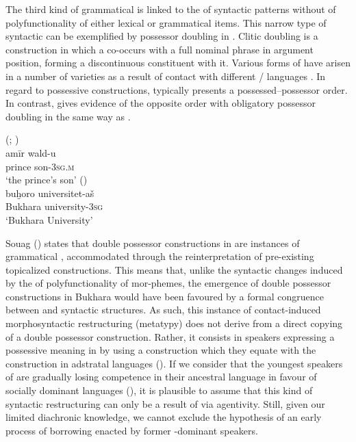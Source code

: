 \documentclass[output=paper]{langsci/langscibook}
\begin{document}
The third kind of grammatical  is linked to the  of syntactic patterns without  of polyfunctionality of either lexical or grammatical items. This narrow type of syntactic  can be exemplified by possessor doubling in   \citep{Ratcliffe2005}. Clitic doubling is a construction in which a  co-occurs with a full nominal phrase in argument position, forming a discontinuous constituent with it. Various forms of  have arisen in a number of  varieties as a result of contact with different / languages \citep{Souag2017clitic}. In regard to possessive constructions,  typically presents a possessed–possessor order. In contrast,    gives evidence of the opposite order with obligatory possessor doubling in the same way as  . 

\ea\label{28}
{  (\citealt{Ratcliffe2005}; \citealt[56]{Souag2017clitic})}\\
\gll   amīr wald-u\\
        prince son-\textsc{3sg.m}\\
\glt   `the prince’s son'
\ex \label{29}
{ (\citealt[56]{Souag2017clitic})}\\
\gll   buḫoro universitet-aš\\
       Bukhara university-\textsc{3sg}\\
\glt   `Bukhara University'
\z

Souag (\citeyear[157]{Souag2017clitic}) states that double possessor constructions in   are instances of grammatical , accommodated through the reinterpretation of pre-existing topicalized constructions. This means that, unlike the syntactic changes induced by the  of polyfunctionality of mor-\linebreak phemes, the emergence of double possessor constructions in Bukhara  would have been favoured by a formal congruence between  and  syntactic structures. As such, this instance of contact-induced morphosyntactic restructuring (metatypy) does not derive from a direct copying of a double possessor construction. Rather, it consists in speakers expressing a possessive meaning in  by using a construction which they equate with the construction in adstratal languages (\citealt[128]{Ross2007}). If we consider that the youngest speakers of   are gradually losing competence in their ancestral language in favour of socially dominant languages (\citealt[128]{Chikovani2005}), it is plausible to assume that this kind of syntactic restructuring can only be a result of  via  agentivity. Still, given our limited diachronic knowledge, we cannot exclude the hypothesis of an early process of borrowing enacted by former -dominant speakers.   
\end{document}
